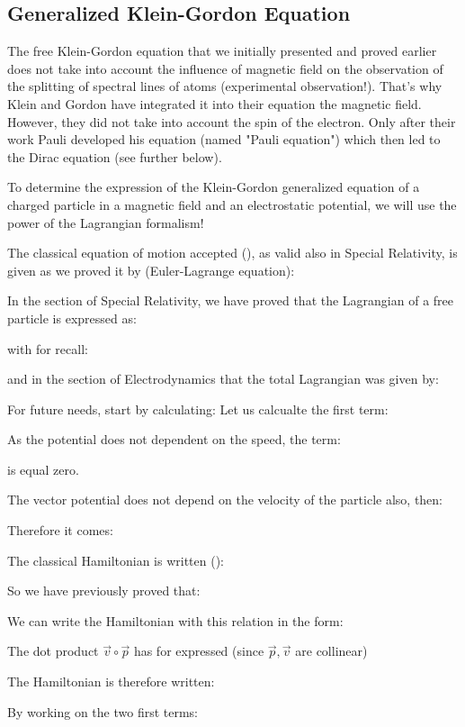 	\subsection{Generalized Klein-Gordon Equation}
	The free Klein-Gordon equation that we initially presented and proved earlier does not take into account the influence of magnetic field on the observation of the splitting of spectral lines of atoms (experimental observation!). That's why Klein and Gordon have integrated it into their equation the magnetic field. However, they did not take into account the spin of the electron. Only after their work Pauli developed his equation (named "Pauli equation") which then led to the Dirac equation (see further below).

	To determine the expression of the Klein-Gordon generalized equation of a charged particle in a magnetic field and an electrostatic potential, we will use the power of the Lagrangian formalism!

	The classical equation of motion accepted (), as valid also in Special Relativity, is given as we proved it by (Euler-Lagrange equation):
	
	In the section of Special Relativity, we have proved that the Lagrangian of a free particle is expressed as:
	
	with for recall:
	
	and in the section of Electrodynamics that the total Lagrangian was given by:
	
	For future needs, start by calculating:
	Let us calcualte the first term:
	
	As the potential does not dependent on the speed, the term:
	
	is equal zero.

	The vector potential does not depend on the velocity of the particle also, then:
	
	Therefore it comes:
	
	The classical Hamiltonian is written ():
	
	So we have previously proved that:
	
	We can write the Hamiltonian with this relation in the form:
	
	The dot product $\vec{v}\circ\vec{p}$ has for expressed (since $\vec{p},\vec{v}$ are collinear)
	
	The Hamiltonian is therefore written:
	
	By working on the two first terms:
	
